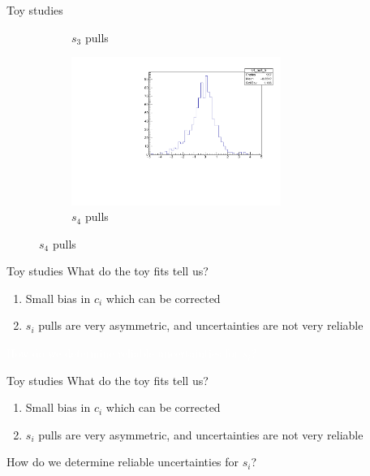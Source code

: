 \documentclass{beamer}
\newcommand{\white}[1]{{\textcolor{white}{#1}}} %
\begin{document}
\begin{frame}{Toy studies}
\begin{figure}
\begin{subfigure}{0.5\textwidth}
      \caption{$s_3$ pulls}
    \end{subfigure}%
    \begin{subfigure}{0.5\textwidth}
      \centering
      \includegraphics[width=0.75\textwidth]{Plots/s4_ToyFits_pull.pdf}
      \caption{$s_4$ pulls}
    \end{subfigure}
  \end{figure}
\end{frame}

\begin{frame}{Toy studies}
  \vspace{0.0cm}
  {\Large What do the toy fits tell us?}
  \vspace{0.5cm}
  \begin{enumerate}
    \setlength\itemsep{2.0em}
    \item{Small bias in $c_i$ which can be corrected}
    \item{$s_i$ pulls are very asymmetric, and uncertainties are not very reliable}
  \end{enumerate}
  \vspace{1.0cm}
  \begin{center}
    \white{\Large How do we determine reliable uncertainties for $s_i$?}
  \end{center}
\end{frame}

\begin{frame}{Toy studies}
  \vspace{0.0cm}
  {\Large What do the toy fits tell us?}
  \vspace{0.5cm}
  \begin{enumerate}
    \setlength\itemsep{2.0em}
    \item{Small bias in $c_i$ which can be corrected}
    \item{$s_i$ pulls are very asymmetric, and uncertainties are not very reliable}
  \end{enumerate}
  \vspace{1.0cm}
  \begin{center}
    {\Large How do we determine reliable uncertainties for $s_i$?}
  \end{center}
\end{frame}
\end{document}
